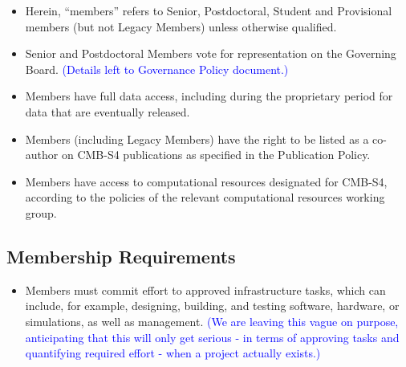 \begin{itemize}
\item Herein, ``members'' refers to Senior, Postdoctoral, Student and Provisional members (but not Legacy Members) unless otherwise qualified.

\item Senior and Postdoctoral Members vote for representation on the Governing Board.  \textcolor{blue}{(Details left to Governance Policy document.)}

\item Members have full data access, including during the proprietary period for data that are eventually released.

\item Members (including Legacy Members) have the right to be listed as a co-author on CMB-S4 publications as specified in the Publication Policy.

\item Members have access to computational resources designated for CMB-S4, according to the policies of the relevant computational resources working group.

\end{itemize}

\subsection{Membership Requirements}
\begin{itemize}



\item Members must commit effort to approved infrastructure tasks, which can include, for example, designing, building, and testing software, hardware, or simulations, as well as management. 
\textcolor{blue}{(We are leaving this vague on purpose, anticipating that this will only get serious - in terms of approving tasks and quantifying required effort - when a project actually exists.)}  

\end{itemize}

